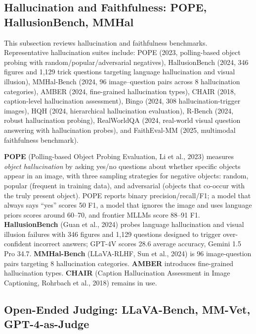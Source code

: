 \documentclass{article}
\begin{document}
\subsection{Hallucination and Faithfulness: POPE, HallusionBench, MMHal}\label{hallucination-and-faithfulness-pope-hallusionbench-mmhal}

This subsection reviews hallucination and faithfulness benchmarks. Representative hallucination suites include: POPE (2023, polling-based object probing with random/popular/adversarial negatives), HallusionBench (2024, 346 figures and 1,129 trick questions targeting language hallucination and visual illusion), MMHal-Bench (2024, 96 image--question pairs across 8 hallucination categories), AMBER (2024, fine-grained hallucination types), CHAIR (2018, caption-level hallucination assessment), Bingo (2024, 308 hallucination-trigger images), HQH (2024, hierarchical hallucination evaluation), R-Bench (2024, robust hallucination probing), RealWorldQA (2024, real-world visual question answering with hallucination probes), and FaithEval-MM (2025, multimodal faithfulness benchmark).

\textbf{POPE} (Polling-based Object Probing Evaluation, Li et al., 2023) measures \emph{object hallucination} by asking yes/no questions about whether specific objects appear in an image, with three sampling strategies for negative objects: random, popular (frequent in training data), and adversarial (objects that co-occur with the truly present object). POPE reports binary precision/recall/F1; a model that always says ``yes'' scores 50 F1, a model that ignores the image and uses language priors scores around 60--70, and frontier MLLMs score 88--91 F1. \textbf{HallusionBench} (Guan et al., 2024) probes language hallucination and visual illusion failures with 346 figures and 1,129 questions designed to trigger over-confident incorrect answers; GPT-4V scores 28.6 average accuracy, Gemini 1.5 Pro 34.7. \textbf{MMHal-Bench} (LLaVA-RLHF, Sun et al., 2024) is 96 image-question pairs targeting 8 hallucination categories. \textbf{AMBER} introduces fine-grained hallucination types. \textbf{CHAIR} (Caption Hallucination Assessment in Image Captioning, Rohrbach et al., 2018) remains in use.

\subsection{Open-Ended Judging: LLaVA-Bench, MM-Vet, GPT-4-as-Judge}\label{open-ended-judging-llava-bench-mm-vet-gpt-4-as-judge}
\end{document}
